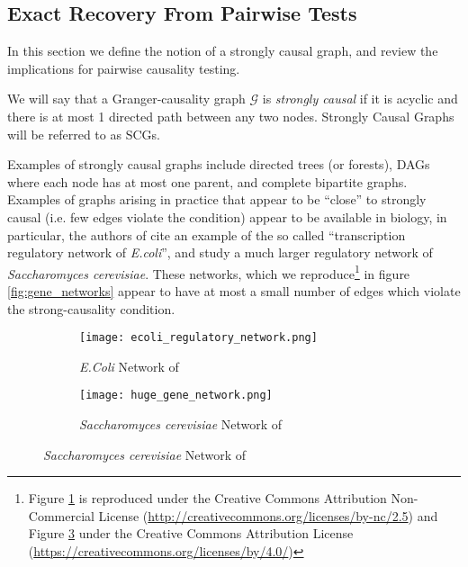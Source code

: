 \documentclass[12pt]{article}
\def\gcg{\mathcal{G}}  %
\begin{document}
\subsection{Exact Recovery From Pairwise Tests}
\label{sec:strongly_causal_graphs}
In this section we define the notion of a strongly causal graph, and
review the implications for pairwise causality testing.

\begin{definition}
  \label{def:strongly_causal}
  We will say that a Granger-causality graph $\gcg$ is
  \textit{strongly causal} if it is acyclic and there is at most 1
  directed path between any two nodes.  Strongly Causal Graphs will be
  referred to as SCGs.
\end{definition}

  Examples of strongly causal graphs include directed trees (or
  forests), DAGs where each node has at most one parent, and complete
  bipartite graphs.  Examples of graphs arising in practice that appear
  to be ``close'' to strongly causal (i.e. few edges violate the condition)
  appear to be available in biology, in particular, the authors of
  \cite{discovering_graphical_Granger_causality_using_the_truncating_lasso_penalty}
  cite an example of the so called ``transcription regulatory network
  of \textit{E.coli}'', and
  \cite{learning_genome_scale_regulatory_networks} study a much larger
  regulatory network of \textit{Saccharomyces cerevisiae}.  These
  networks, which we reproduce\footnote{Figure \ref{fig:gene_network1}
    is reproduced under the Creative Commons Attribution
    Non-Commercial License
    (\url{http://creativecommons.org/licenses/by-nc/2.5}) and Figure
    \ref{fig:gene_network2} under the Creative Commons Attribution
    License (\url{https://creativecommons.org/licenses/by/4.0/})} in
  figure \ref{fig:gene_networks} appear to have at most a small number
  of edges which violate the strong-causality condition.

  \begin{figure}[h]
    \centering
    \caption{Transcription Regulatory Networks}
    \label{fig:gene_networks}
    \begin{subfigure}[b]{0.45\textwidth}
      \caption{\textit{E.Coli} Network of
        \cite{discovering_graphical_Granger_causality_using_the_truncating_lasso_penalty}}
      \label{fig:gene_network1}
      \texttt{[image: ecoli\_regulatory\_network.png]}
    \end{subfigure}
    \begin{subfigure}[b]{0.45\textwidth}
      \caption{\textit{Saccharomyces cerevisiae} Network of
        \cite{learning_genome_scale_regulatory_networks}}
      \label{fig:gene_network2}
      \texttt{[image: huge\_gene\_network.png]}
    \end{subfigure}
  \end{figure}
\end{document}
